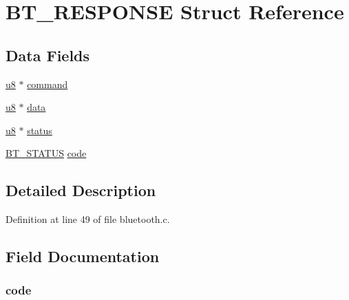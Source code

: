 \hypertarget{struct_b_t___r_e_s_p_o_n_s_e}{\section{B\-T\-\_\-\-R\-E\-S\-P\-O\-N\-S\-E Struct Reference}
\label{struct_b_t___r_e_s_p_o_n_s_e}
}
\subsection*{Data Fields}
\begin{DoxyCompactItemize}
\item 
\hyperlink{p8_2pinguino_2core_2typedef_8h_aed742c436da53c1080638ce6ef7d13de}{u8} $\ast$ \hyperlink{struct_b_t___r_e_s_p_o_n_s_e_a8d1ef2a2d0701e536e45f0ef64ab3c7e}{command}
\item 
\hyperlink{p8_2pinguino_2core_2typedef_8h_aed742c436da53c1080638ce6ef7d13de}{u8} $\ast$ \hyperlink{struct_b_t___r_e_s_p_o_n_s_e_a40767ad71451f60885c01f28dd2a4b47}{data}
\item 
\hyperlink{p8_2pinguino_2core_2typedef_8h_aed742c436da53c1080638ce6ef7d13de}{u8} $\ast$ \hyperlink{struct_b_t___r_e_s_p_o_n_s_e_a938eb71a1ec2d6626b341381e12a0c61}{status}
\item 
\hyperlink{bluetooth_8c_af17ab5c1acc876e64d4e684b5dd7a7ce}{B\-T\-\_\-\-S\-T\-A\-T\-U\-S} \hyperlink{struct_b_t___r_e_s_p_o_n_s_e_a7425c776792208fc8fb7ee7a28ee1510}{code}
\end{DoxyCompactItemize}


\subsection{Detailed Description}


Definition at line 49 of file bluetooth.\-c.



\subsection{Field Documentation}
\hypertarget{struct_b_t___r_e_s_p_o_n_s_e_a7425c776792208fc8fb7ee7a28ee1510}{
\subsubsection[{code}]{ code}}\label{struct_b_t___r_e_s_p_o_n_s_e_a7425c776792208fc8fb7ee7a28ee1510}


